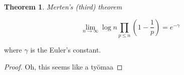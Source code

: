\documentclass{article}
\theoremstyle{definition}
\newtheorem{theorem}[subsection]{Theorem}
\begin{document}
\begin{theorem}{\emph{Merten's (third) theorem}}

\begin{equation*}
    \lim_{n \rightarrow \infty} \log n \prod_{p\leq n} \left(1-\frac{1}{p}\right) = e^{-\gamma}
\end{equation*}

where $\gamma$ is the Euler's constant.

\begin{proof}

Oh, this seems like a työmaa

\end{proof}

\end{theorem}
\end{document}
